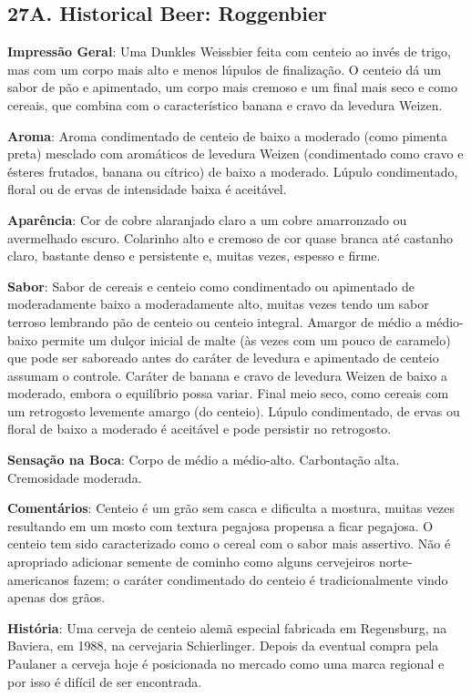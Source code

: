 \subsection*{27A. Historical Beer: Roggenbier}
\textbf{Impressão Geral}: Uma Dunkles Weissbier feita com centeio ao invés de trigo, mas com um corpo mais alto e menos lúpulos de finalização. O centeio dá um sabor de pão e apimentado, um corpo mais cremoso e um final mais seco e como cereais, que combina com o característico banana e cravo da levedura Weizen.

\textbf{Aroma}: Aroma condimentado de centeio de baixo a moderado (como pimenta preta) mesclado com aromáticos de levedura Weizen (condimentado como cravo e ésteres frutados, banana ou cítrico) de baixo a moderado. Lúpulo condimentado, floral ou de ervas de intensidade baixa é aceitável.

\textbf{Aparência}: Cor de cobre alaranjado claro a um cobre amarronzado ou avermelhado escuro. Colarinho alto e cremoso de cor quase branca até castanho claro, bastante denso e persistente e, muitas vezes, espesso e firme.

\textbf{Sabor}: Sabor de cereais e centeio como condimentado ou apimentado de moderadamente baixo a moderadamente alto, muitas vezes tendo um sabor terroso lembrando pão de centeio ou centeio integral. Amargor de médio a médio-baixo permite um dulçor inicial de malte (às vezes com um pouco de caramelo) que pode ser saboreado antes do caráter de levedura e apimentado de centeio assumam o controle. Caráter de banana e cravo de levedura Weizen de baixo a moderado, embora o equilíbrio possa variar. Final meio seco, como cereais com um retrogosto levemente amargo (do centeio). Lúpulo condimentado, de ervas ou floral de baixo a moderado é aceitável e pode persistir no retrogosto.

\textbf{Sensação na Boca}: Corpo de médio a médio-alto. Carbontação alta. Cremosidade moderada.

\textbf{Comentários}: Centeio é um grão sem casca e dificulta a mostura, muitas vezes resultando em um mosto com textura pegajosa propensa a ficar pegajosa. O centeio tem sido caracterizado como o cereal com o sabor mais assertivo. Não é apropriado adicionar semente de cominho como alguns cervejeiros norte-americanos fazem; o caráter condimentado do centeio é tradicionalmente vindo apenas dos grãos.

\textbf{História}: Uma cerveja de centeio alemã especial fabricada em Regensburg, na Baviera, em 1988, na cervejaria Schierlinger. Depois da eventual compra pela Paulaner a cerveja hoje é posicionada no mercado como uma marca regional e por isso é difícil de ser encontrada.

